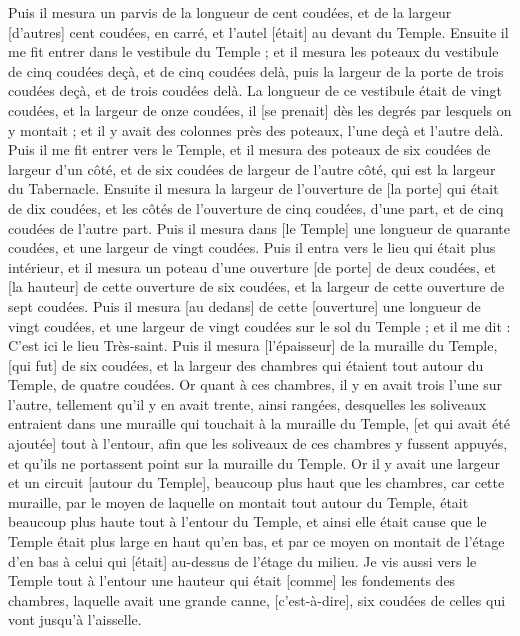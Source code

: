 \begin{multicols}{2}
Puis il mesura un parvis de la longueur de cent coudées, et de la largeur [d'autres] cent coudées, en carré, et l'autel [était] au devant du Temple.
Ensuite il me fit entrer dans le vestibule du Temple ; et il mesura les poteaux du vestibule de cinq coudées deçà, et de cinq coudées delà, puis la largeur de la porte de trois coudées deçà, et de trois coudées delà.
La longueur de ce vestibule était de vingt coudées, et la largeur de onze coudées, il [se prenait] dès les degrés par lesquels on y montait ; et il y avait des colonnes près des poteaux, l'une deçà et l'autre delà.
\VerseOne{}Puis il me fit entrer vers le Temple, et il mesura des poteaux de six coudées de largeur d'un côté, et de six coudées de largeur de l'autre côté, qui est la largeur du Tabernacle.
Ensuite il mesura la largeur de l'ouverture de [la porte] qui était de dix coudées, et les côtés de l'ouverture de cinq coudées, d'une part, et de cinq coudées de l'autre part. Puis il mesura dans [le Temple] une longueur de quarante coudées, et une largeur de vingt coudées.
Puis il entra vers le lieu qui était plus intérieur, et il mesura un poteau d'une ouverture [de porte] de deux coudées, et [la hauteur] de cette ouverture de six coudées, et la largeur de cette ouverture de sept coudées.
Puis il mesura [au dedans] de cette [ouverture] une longueur de vingt coudées, et une largeur de vingt coudées sur le sol du Temple ; et il me dit : C'est ici le lieu Très-saint.
Puis il mesura [l'épaisseur] de la muraille du Temple, [qui fut] de six coudées, et la largeur des chambres qui étaient tout autour du Temple, de quatre coudées.
Or quant à ces chambres, il y en avait trois l'une sur l'autre, tellement qu'il y en avait trente, ainsi rangées, desquelles les soliveaux entraient dans une muraille qui touchait à la muraille du Temple, [et qui avait été ajoutée] tout à l'entour, afin que les soliveaux de ces chambres y fussent appuyés, et qu'ils ne portassent point sur la muraille du Temple.
Or il y avait une largeur et un circuit [autour du Temple], beaucoup plus haut que les chambres, car cette muraille, par le moyen de laquelle on montait tout autour du Temple, était beaucoup plus haute tout à l'entour du Temple, et ainsi elle était cause que le Temple était plus large en haut qu'en bas, et par ce moyen on montait de l'étage d'en bas à celui qui [était] au-dessus de l'étage du milieu.
Je vis aussi vers le Temple tout à l'entour une hauteur qui était [comme] les fondements des chambres, laquelle avait une grande canne, [c'est-à-dire], six coudées de celles qui vont jusqu'à l'aisselle.

\end{multicols}
